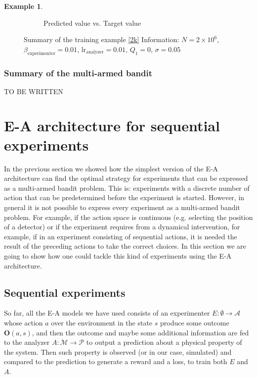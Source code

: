 \documentclass[11pt,a4paper,twoside]{report}
\newcommand{\+}{\textnormal{+} }
\theoremstyle{definition}
\newtheorem{myex}[mythm]{Example}
\numberwithin{equation}{chapter}
\begin{document}
\begin{myex}
\begin{figure}[]
\begin{subfigure}{.5\textwidth}
        \caption{Predicted value vs. Target value}
        \label{fig:actionsMAB6}
      \end{subfigure}
      \caption{ Summary of the training example \eqref{2k}
         Information: $N=2\times10^6$,
      $\beta_\text{experimenter}=0.01$, $\text{lr}_\text{analyzer}=0.01$,
      $Q_1=0$, $\sigma=0.05$}
    \end{figure}
  \end{myex}

  \subsection{Summary of the multi-armed bandit}
  TO BE WRITTEN



\chapter{E-A architecture for sequential experiments}

In the previous section we showed how the simplest version of the
E-A architecture can find the optimal strategy for experiments that can be
expressed as a multi-armed bandit problem. This is: experiments with a discrete
number of action that can be predetermined before the experiment is started.
However, in general it is not possible to express every experiment as a 
multi-armed bandit problem. For example, if the action space is continuous 
(e.g. selecting the position of a detector) or if the experiment 
requires from a dynamical intervention, for example, if in an experiment
consisting of sequential actions, it is needed the result of 
the preceding actions to take the correct choices. In this section we are going
to show how one could tackle this kind of experiments using the E-A 
architecture. 

\section{Sequential experiments}

So far, all the E-A models we have used consists of an experimenter $E:\emptyset
\rightarrow \mathcal{A}$ whose action $a$ over the environment in the state $s$
produce some outcome $\textbf{O}(a,s)$, and then the outcome and maybe some
additional information are fed to the analyzer $A:\mathcal{M} \rightarrow
\mathcal{P}$ to output a prediction about a physical property of the system.
Then such property is observed (or in our case, simulated) and compared to the
prediction to generate a reward and a loss, to train both $E$ and $A$. 
\end{document}
